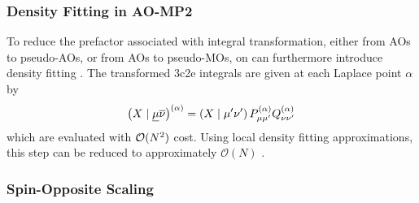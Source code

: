 
\subsubsection{Density Fitting in AO-MP2}

To reduce the prefactor associated with integral transformation, either from AOs to pseudo-AOs, or from AOs to pseudo-MOs, on can furthermore introduce density fitting \cite{Zie2009,Mau2014}. The transformed 3c2e integrals are given at each Laplace point $\alpha$ by
\begin{equation}
\left( X \mid \underline{\mu}\overline{\nu} \right)^{(\alpha)} = \left( X \mid \mu'\nu' \right) P^{(\alpha)}_{\mu\mu'} Q^{(\alpha)}_{\nu\nu'}  
\end{equation}
\noindent which are evaluated with $\mathcal{O}(N^{2})$ cost. Using local density fitting approximations, this step can be reduced to approximately $\mathcal{O}(N)$ \cite{Gla2020}.

\subsubsection{Spin-Opposite Scaling}

